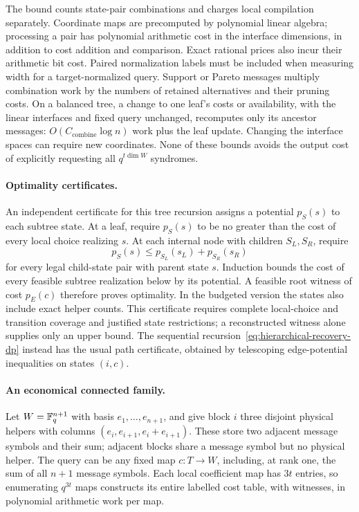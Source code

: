 The bound counts state-pair combinations and charges local compilation
separately.  Coordinate maps are precomputed by polynomial linear algebra;
processing a pair has polynomial arithmetic cost in the interface dimensions,
in addition to cost addition and comparison.  Exact rational prices also
incur their arithmetic bit cost.
Paired normalization labels must be included when measuring width for a
target-normalized query.  Support or Pareto messages multiply combination
work by the numbers of retained alternatives and their pruning costs.
On a balanced tree, a change to one leaf's costs or availability, with the
linear interfaces and fixed query unchanged, recomputes only its ancestor
messages: $O(C_{\mathrm{combine}}\log n)$ work plus the leaf update.
Changing the interface spaces can require new coordinates.  None of these
bounds avoids the output cost of explicitly requesting all $q^{t\dim W}$
syndromes.

\paragraph{Optimality certificates.}
An independent certificate for this tree recursion assigns a
potential $p_S(s)$ to each subtree state.  At a leaf, require
$p_S(s)$ to be no greater than the cost of every local choice realizing $s$.
At each internal node with children $S_L,S_R$, require
\[
 p_S(s)\leq p_{S_L}(s_L)+p_{S_R}(s_R)
\]
for every legal child-state pair with parent state $s$.  Induction bounds the
cost of every feasible subtree realization below by its potential.  A feasible
root witness of cost $p_E(c)$ therefore proves optimality.  In the budgeted
version the states also include exact helper counts.  This certificate requires
complete local-choice and transition coverage and justified state restrictions;
a reconstructed witness alone supplies only an upper bound.  The sequential
recursion~\eqref{eq:hierarchical-recovery-dp} instead has the usual path
certificate, obtained by telescoping edge-potential inequalities on states
$(i,c)$.

\paragraph{An economical connected family.}
Let $W=\mathbb F_q^{n+1}$ with basis $e_1,\ldots,e_{n+1}$, and give block $i$
three disjoint physical helpers with columns
$(e_i,e_{i+1},e_i+e_{i+1})$.  These store two adjacent message symbols
and their sum; adjacent blocks share a message symbol but no physical helper.
The query can be any fixed map $c:T\to W$, including, at rank one, the sum
of all $n+1$ message symbols.  Each local coefficient map has $3t$ entries,
so enumerating $q^{3t}$ maps constructs its entire labelled cost table,
with witnesses, in polynomial arithmetic work per map.

